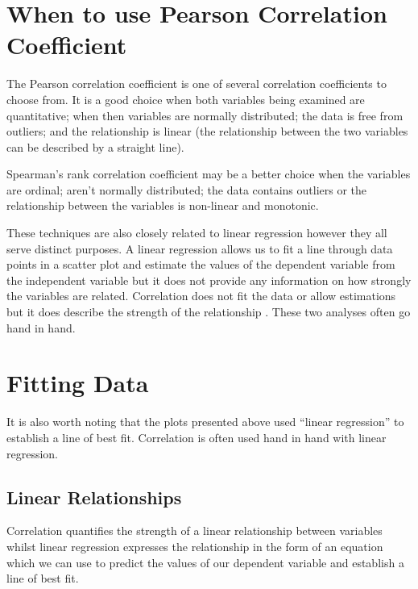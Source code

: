 \documentclass[
]{book}
\begin{document}
\hypertarget{when-to-use-pearson-correlation-coefficient}{%
\section{When to use Pearson Correlation Coefficient}\label{when-to-use-pearson-correlation-coefficient}}

The Pearson correlation coefficient is one of several correlation coefficients to choose from. It is a good choice when both variables being examined are quantitative; when then variables are normally distributed; the data is free from outliers; and the relationship is linear (the relationship between the two variables can be described by a straight line).

Spearman's rank correlation coefficient may be a better choice when the variables are ordinal; aren't normally distributed; the data contains outliers or the relationship between the variables is non-linear and monotonic.

These techniques are also closely related to linear regression however they all serve distinct purposes. A linear regression allows us to fit a line through data points in a scatter plot and estimate the values of the dependent variable from the independent variable but it does not provide any information on how strongly the variables are related. Correlation does not fit the data or allow estimations but it does describe the strength of the relationship \citep{schober}. These two analyses often go hand in hand.

\hypertarget{fitting-data}{%
\section{Fitting Data}\label{fitting-data}}

It is also worth noting that the plots presented above used ``linear regression'' to establish a line of best fit. Correlation is often used hand in hand with linear regression.

\hypertarget{linear-relationships}{%
\subsection{Linear Relationships}\label{linear-relationships}}

Correlation quantifies the strength of a linear relationship between variables whilst linear regression expresses the relationship in the form of an equation which we can use to predict the values of our dependent variable and establish a line of best fit.
\end{document}
